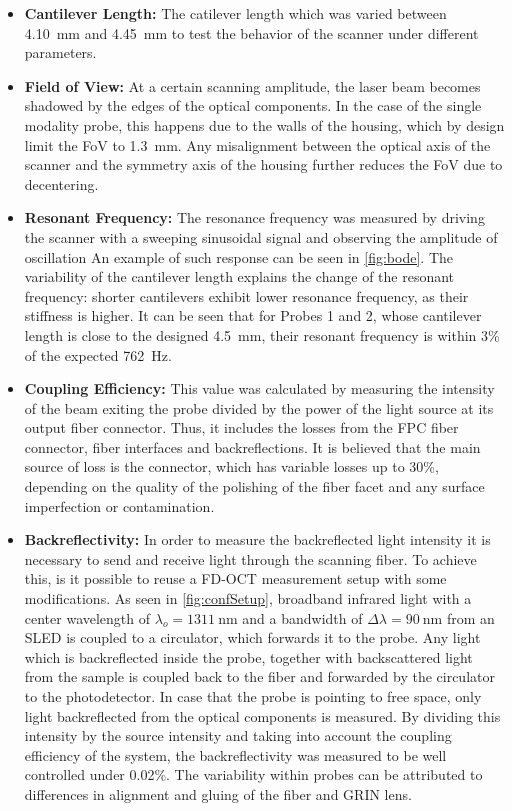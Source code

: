 \begin{itemize}


\item \textbf{Cantilever Length:} The catilever length which was varied between \SI{4.10}{\milli\meter} and \SI{4.45}{\milli\meter} to test the behavior of the scanner under different parameters. 

\item \textbf{Field of View:} At a certain scanning amplitude, the laser beam becomes shadowed by the edges of the optical components. In the case of the single modality probe, this happens due to the walls of the housing, which by design limit the FoV to \SI{1.3}{\milli\meter}. Any misalignment between the optical axis of the scanner and the symmetry axis of the housing further reduces the FoV due to decentering.

\item \textbf{Resonant Frequency:} The resonance frequency was measured by driving the scanner with a sweeping sinusoidal signal and observing the amplitude of oscillation An example of such response can be seen in \autoref{fig:bode}. The variability of the cantilever length explains the change of the resonant frequency: shorter cantilevers exhibit lower resonance frequency, as their stiffness is higher. It can be seen that for Probes 1 and 2, whose cantilever length is close to the designed \SI{4.5}{\milli\meter}, their resonant frequency is within 3\% of the expected \SI{762}{\hertz}. 

\item \textbf{Coupling Efficiency:} This value was calculated by measuring the intensity of the beam exiting the probe divided by the power of the light source at its output fiber connector. Thus, it includes the losses from the FPC fiber connector, fiber interfaces and backreflections. It is believed that the main source of loss is the connector, which has variable losses up to 30\%, depending on the quality of the polishing of the fiber facet and any surface imperfection or contamination. 

\item \textbf{Backreflectivity:} In order to measure the backreflected light intensity it is necessary to send and receive light through the scanning fiber. To achieve this, is it possible to reuse a FD-OCT measurement setup with some modifications. As seen in \autoref{fig:confSetup}, broadband infrared light with a center wavelength of $\lambda_o = \SI{1311}{\nano\meter}$ and a bandwidth of $\Delta \lambda = \SI{90}{\nano\meter} $ from an SLED is coupled to a circulator, which forwards it to the probe. Any light which is backreflected inside the probe, together with backscattered light from the sample is coupled back to the fiber and forwarded by the circulator to the photodetector. In case that the probe is pointing to free space, only light backreflected from the optical components is measured. By dividing this intensity by the source intensity and taking into account the coupling efficiency of the system, the backreflectivity was measured to be well controlled under 0.02\%. The variability within probes can be attributed to differences in alignment and gluing of the fiber and GRIN lens.


\end{itemize}
